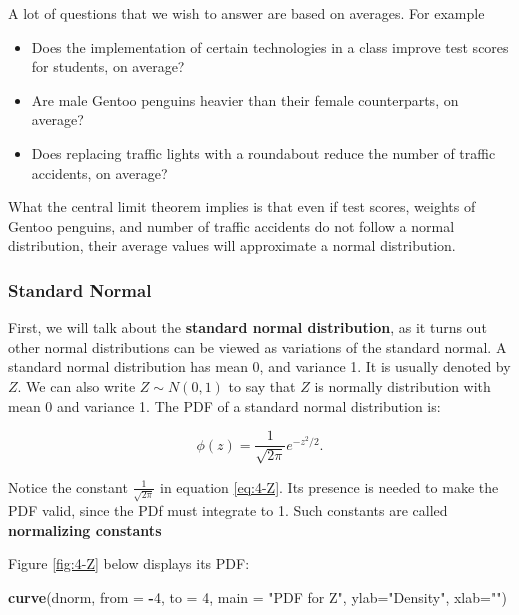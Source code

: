 \documentclass[
]{book}
\newenvironment{Shaded}{\begin{snugshade}}{\end{snugshade}}
\newcommand{\AttributeTok}[1]{\textcolor[rgb]{0.13,0.29,0.53}{#1}}
\newcommand{\DecValTok}[1]{\textcolor[rgb]{0.00,0.00,0.81}{#1}}
\newcommand{\FunctionTok}[1]{\textcolor[rgb]{0.13,0.29,0.53}{\textbf{#1}}}
\newcommand{\NormalTok}[1]{#1}
\newcommand{\SpecialCharTok}[1]{\textcolor[rgb]{0.81,0.36,0.00}{\textbf{#1}}}
\newcommand{\StringTok}[1]{\textcolor[rgb]{0.31,0.60,0.02}{#1}}
\providecommand{\tightlist}{%
  \setlength{\itemsep}{0pt}\setlength{\parskip}{0pt}}
\begin{document}
A lot of questions that we wish to answer are based on averages. For example

\begin{itemize}
\tightlist
\item
  Does the implementation of certain technologies in a class improve test scores for students, on average?
\item
  Are male Gentoo penguins heavier than their female counterparts, on average?
\item
  Does replacing traffic lights with a roundabout reduce the number of traffic accidents, on average?
\end{itemize}

What the central limit theorem implies is that even if test scores, weights of Gentoo penguins, and number of traffic accidents do not follow a normal distribution, their average values will approximate a normal distribution.

\subsubsection{Standard Normal}\label{standard-normal}

First, we will talk about the \textbf{standard normal distribution}, as it turns out other normal distributions can be viewed as variations of the standard normal. A standard normal distribution has mean 0, and variance 1. It is usually denoted by \(Z\). We can also write \(Z \sim N(0,1)\) to say that \(Z\) is normally distribution with mean 0 and variance 1. The PDF of a standard normal distribution is:

\begin{equation} 
\phi(z) = \frac{1}{\sqrt{2 \pi}} e^{-z^2/2}.
\label{eq:4-Z}
\end{equation}

Notice the constant \(\frac{1}{\sqrt{2 \pi}}\) in equation \eqref{eq:4-Z}. Its presence is needed to make the PDF valid, since the PDf must integrate to 1. Such constants are called \textbf{normalizing constants}

Figure \ref{fig:4-Z} below displays its PDF:

\begin{Shaded}
\begin{Highlighting}[]
\FunctionTok{curve}\NormalTok{(dnorm, }\AttributeTok{from =} \SpecialCharTok{{-}}\DecValTok{4}\NormalTok{, }\AttributeTok{to =} \DecValTok{4}\NormalTok{, }\AttributeTok{main =} \StringTok{"PDF for Z"}\NormalTok{, }\AttributeTok{ylab=}\StringTok{"Density"}\NormalTok{, }\AttributeTok{xlab=}\StringTok{""}\NormalTok{)}
\end{Highlighting}
\end{Shaded}
\end{document}
